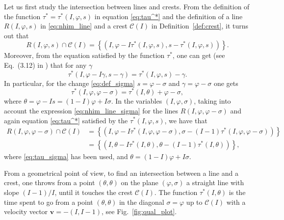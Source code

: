 \documentclass[a4paper,10pt]{article}
\newcommand{\NH}{\text{NHIM}}
\theoremstyle{definition}
\begin{document}
Let us first study the intersection between {\NH} lines and crests.
From the definition of the function $\tau^* = \tau^*(I,\varphi,s)$ in equation \eqref{eq:tau^*} and the definition of a {\NH} line $R(I,\varphi,s)$ in \eqref{eq:nhim_line} and a crest $\mathcal{C}(I)$ in Definition~\ref{def:crest}, it turns out that
\begin{equation*}
R(I,\varphi,s)\cap\mathcal{C}(I) = \left\{\left(I,\varphi- I\tau^*(I,\varphi,s),s - \tau^*(I,\varphi,s) \right)\right\}.
\end{equation*}
Moreover, from the equation satisfied by the function $\tau^*$, one can get (see Eq.~(3.12) in \cite{Delshams2017}) that for any $\gamma$
\begin{equation*}
\tau^*(I,\varphi - I\gamma, s -\gamma) = \tau^*(I,\varphi,s) - \gamma.
\end{equation*}
In particular, for the change \eqref{eq:def_sigma} $s = \varphi - \sigma$ and $\gamma = \varphi - \sigma$ one gets
\begin{equation}\label{eq:tau_sigma}
\tau^*(I,\varphi,\varphi-\sigma) = \tau^*(I,\theta) + \varphi - \sigma,
\end{equation}
where $\theta = \varphi - Is = (1-I)\varphi + I\sigma$.
In the variables $(I,\varphi,\sigma)$, taking into account the expression \eqref{eq:nhim_line_sigma} for the {\NH} lines $R(I,\varphi,\varphi - \sigma)$ and again equation \eqref{eq:tau^*} satisfied by the $\tau^*(I,\varphi,s)$, we have that
\begin{align*}
R(I,\varphi, \varphi-\sigma)\cap\mathcal{C}(I) &= \left\{\left(I,\varphi - I\tau^*(I,\varphi,\varphi-\sigma) , \sigma - (I-1)\tau^*(I,\varphi,\varphi -\sigma )\right)\right\}\\
&=\left\{\left(I,\theta - I\tau^*(I,\theta),\theta - (I-1)\tau^*(I,\theta)\right)\right\},
\end{align*}
where \eqref{eq:tau_sigma} has been used, and $\theta = (1-I)\varphi + I\sigma$.

From a geometrical point of view, to find an intersection between a {\NH} line and a crest, one throws from a point $(\theta , \theta)$ on the plane $(\varphi,\sigma)$ a straight line with slope $(I-1)/I$, until it touches the crest $\mathcal{C}(I)$. The function $\tau^*(I,\theta)$ is the time spent to go from a point $(\theta,\theta)$ in the diagonal $\sigma = \varphi$ up to $\mathcal{C}(I)$ with a velocity vector $\mathbf{v} = -(I , I-1)$, see Fig.~\ref{fig:qual_plot}.
\end{document}
